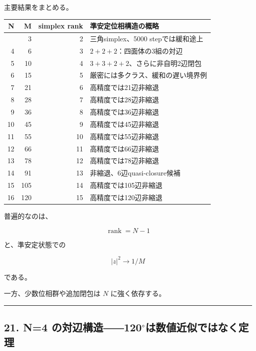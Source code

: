 \documentclass[
  a4paper,
]{ltjsarticle}
\newcounter{none} %
\begin{document}
主要結果をまとめる。

{\def\LTcaptype{none} %
\begin{longtable}[]{@{}rrrl@{}}
\toprule\noalign{}
N & M & simplex rank & 準安定位相構造の概略 \\
\midrule\noalign{}
\endhead
\bottomrule\noalign{}
\endlastfoot
3 & 3 & 2 & 三角simplex、5000 stepでは緩和途上 \\
4 & 6 & 3 & \(2+2+2\)：四面体の3組の対辺 \\
5 & 10 & 4 & \(3+3+2+2\)、さらに非自明2辺閉包 \\
6 & 15 & 5 & 厳密には多クラス、緩和の遅い境界例 \\
7 & 21 & 6 & 高精度では21辺非縮退 \\
8 & 28 & 7 & 高精度では28辺非縮退 \\
9 & 36 & 8 & 高精度では36辺非縮退 \\
10 & 45 & 9 & 高精度では45辺非縮退 \\
11 & 55 & 10 & 高精度では55辺非縮退 \\
12 & 66 & 11 & 高精度では66辺非縮退 \\
13 & 78 & 12 & 高精度では78辺非縮退 \\
14 & 91 & 13 & 非縮退、6辺quasi-closure候補 \\
15 & 105 & 14 & 高精度では105辺非縮退 \\
16 & 120 & 15 & 高精度では120辺非縮退 \\
\end{longtable}
}

普遍的なのは、

\[
\boxed{
\operatorname{rank}=N-1
}
\]

と、準安定状態での

\[
\boxed{
|z|^2\rightarrow1/M
}
\]

である。

一方、少数位相群や追加閉包は \(N\) に強く依存する。

\begin{center}\rule{0.5\linewidth}{0.5pt}\end{center}

\subsection{\texorpdfstring{21. N=4
の対辺構造――120\(^\circ\)は数値近似ではなく定理}{21. N=4 の対辺構造――120\^{}\textbackslash circは数値近似ではなく定理}}\label{n4-ux306eux5bfeux8fbaux69cbux9020120circux306fux6570ux5024ux8fd1ux4f3cux3067ux306fux306aux304fux5b9aux7406}
\end{document}
